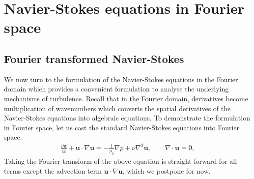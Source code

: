 \section{Navier-Stokes equations in Fourier space}
\subsection{Fourier transformed Navier-Stokes}
We now turn to the formulation of the Navier-Stokes equations in the Fourier domain which provides a convenient formulation to analyse the underlying mechanisms of turbulence. Recall that in the Fourier domain, derivatives become multiplication of wavenumbers which converts the spatial derivatives of the Navier-Stokes equations into algebraic equations. To demonstrate the formulation in Fourier space, let us cast the standard Navier-Stokes equations into Fourier space. 
\begin{align}
\frac{\partial \bm{u}}{\partial t} + \bm{u}\cdot\nabla\bm{u} = -\frac{1}{\rho_{0}}\nabla p + \nu\nabla^{2}\bm{u}, \qquad \nabla\cdot\bm{u}=0,
\end{align}
Taking the Fourier transform of the above equation is straight-forward for all terms except the advection term $\bm{u}\cdot\nabla\bm{u}$, which we postpone for now.

